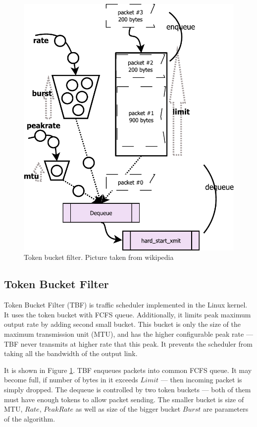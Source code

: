 \begin{figure}
	\centering
	\includegraphics[width=137mm]{drawings/tbf}
	\caption{Token bucket filter. Picture taken from wikipedia \cite{TBF:picture}}
	
	\label{fig09:tbf}
\end{figure}

\subsection{Token Bucket Filter}
Token Bucket Filter (TBF) is traffic scheduler implemented in the Linux kernel. It uses the token bucket with FCFS queue. Additionally, it limits peak maximum output rate by adding second small bucket. This bucket is only the size of the maximum transmission unit (MTU), and has the higher configurable peak rate --- TBF never transmits at higher rate that this peak. It prevents the scheduler from taking all the bandwidth of the output link.

It is shown in Figure \ref{fig09:tbf}. TBF enqueues packets into common FCFS queue. It may become full, if number of bytes in it exceeds $Limit$ --- then incoming packet is simply dropped. The dequeue is controlled by two token buckets --- both of them must have enough tokens to allow packet sending. The smaller bucket is size of MTU, $Rate$, $PeakRate$ as well as size of the bigger bucket $Burst$ are parameters of the algorithm.

